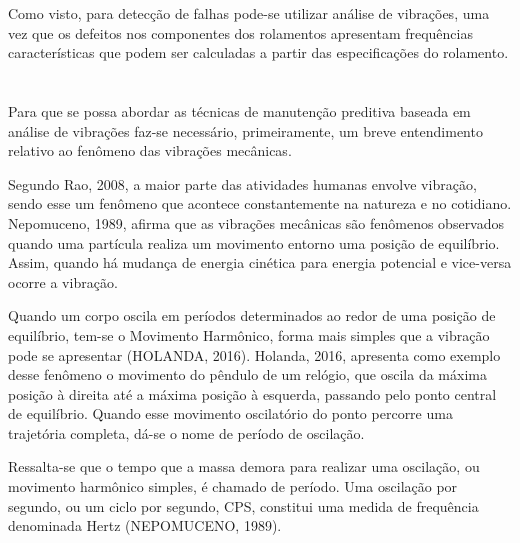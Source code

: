 \documentclass[
	12pt,				
	oneside,			
	a4paper,			
	english,			
	brazil,			
	]{abntex2ppgsi}
\begin{document}
Como visto, para detecção de falhas pode-se utilizar análise de vibrações, uma vez que os defeitos nos componentes dos rolamentos apresentam frequências características que podem ser calculadas a partir das especificações do rolamento. 

\newpage
\section{}

Para que se possa abordar as técnicas de manutenção preditiva baseada em análise de vibrações faz-se necessário, primeiramente, um breve entendimento relativo ao fenômeno das vibrações mecânicas. 

Segundo Rao, 2008, a maior parte das atividades humanas envolve vibração, sendo esse um fenômeno que acontece constantemente na natureza e no cotidiano. Nepomuceno, 1989, afirma que as vibrações mecânicas são fenômenos observados quando uma partícula realiza um movimento entorno uma posição de equilíbrio. Assim, quando há mudança de energia cinética para energia potencial e vice-versa ocorre a vibração. 

Quando um corpo oscila em períodos determinados ao redor de uma posição de equilíbrio, tem-se o Movimento Harmônico, forma mais simples que a vibração pode se apresentar (HOLANDA, 2016). Holanda, 2016, apresenta como exemplo desse fenômeno o movimento do pêndulo de um relógio, que oscila da máxima posição à direita até a máxima posição à esquerda, passando pelo ponto central de equilíbrio. Quando esse movimento oscilatório do ponto percorre uma trajetória completa, dá-se o nome de período de oscilação.  

Ressalta-se que o tempo que a massa demora para realizar uma oscilação, ou movimento harmônico simples, é chamado de período. Uma oscilação por segundo, ou um ciclo por segundo, CPS, constitui uma medida de frequência denominada Hertz (NEPOMUCENO, 1989). 


\end{document}
